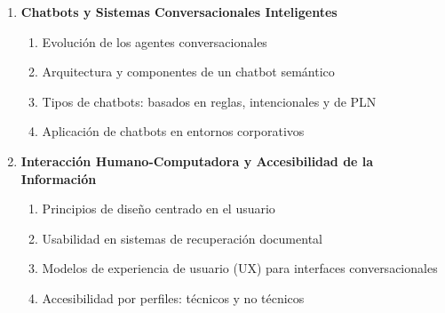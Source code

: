 \begin{enumerate}
  \item \textbf{Chatbots y Sistemas Conversacionales Inteligentes}
  \begin{enumerate}
    \item Evolución de los agentes conversacionales
    \item Arquitectura y componentes de un chatbot semántico
    \item Tipos de chatbots: basados en reglas, intencionales y de PLN
    \item Aplicación de chatbots en entornos corporativos
  \end{enumerate}

  \item \textbf{Interacción Humano-Computadora y Accesibilidad de la Información}
  \begin{enumerate}
    \item Principios de diseño centrado en el usuario
    \item Usabilidad en sistemas de recuperación documental
    \item Modelos de experiencia de usuario (UX) para interfaces conversacionales
    \item Accesibilidad por perfiles: técnicos y no técnicos
  \end{enumerate}
\end{enumerate}
